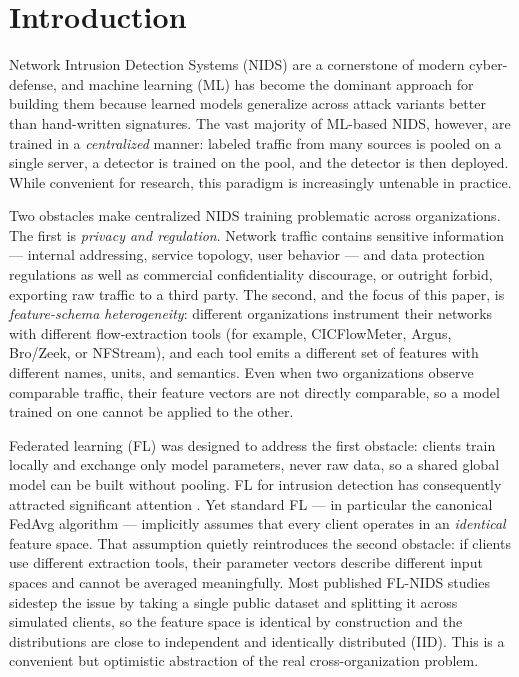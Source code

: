 \documentclass[11pt,a4paper]{article}
\begin{document}
\section{Introduction}
Network Intrusion Detection Systems (NIDS) are a cornerstone of modern
cyber-defense, and machine learning (ML) has become the dominant approach for
building them because learned models generalize across attack variants better
than hand-written signatures. The vast majority of ML-based NIDS, however, are
trained in a \emph{centralized} manner: labeled traffic from many sources is
pooled on a single server, a detector is trained on the pool, and the detector is
then deployed. While convenient for research, this paradigm is increasingly
untenable in practice.

Two obstacles make centralized NIDS training problematic across organizations.
The first is \emph{privacy and regulation}. Network traffic contains sensitive
information --- internal addressing, service topology, user behavior --- and data
protection regulations as well as commercial confidentiality discourage, or
outright forbid, exporting raw traffic to a third party. The second, and the focus
of this paper, is \emph{feature-schema heterogeneity}: different organizations
instrument their networks with different flow-extraction tools (for example,
CICFlowMeter, Argus, Bro/Zeek, or NFStream), and each tool emits a different set
of features with different names, units, and semantics. Even when two
organizations observe comparable traffic, their feature vectors are not directly
comparable, so a model trained on one cannot be applied to the other.

Federated learning (FL) \cite{mcmahan} was designed to address the first obstacle:
clients train locally and exchange only model parameters, never raw data, so a
shared global model can be built without pooling. FL for intrusion detection has
consequently attracted significant attention \cite{ref-fl-survey,ref-fl-review}.
Yet standard FL --- in particular the canonical FedAvg algorithm --- implicitly
assumes that every client operates in an \emph{identical} feature space. That
assumption quietly reintroduces the second obstacle: if clients use different
extraction tools, their parameter vectors describe different input spaces and
cannot be averaged meaningfully. Most published FL-NIDS studies sidestep the issue
by taking a single public dataset and splitting it across simulated clients, so
the feature space is identical by construction and the distributions are close to
independent and identically distributed (IID). This is a convenient but
optimistic abstraction of the real cross-organization problem.
\end{document}
